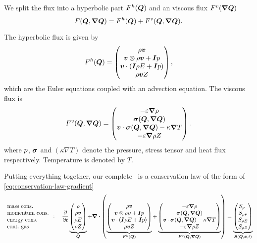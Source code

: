 We split the flux into a hyperbolic part $F^{h}(\bm{Q})$ and an viscous flux $\viscFlux(\gradQ)$
\begin{equation}
  \label{eq:flux}
  \flux(\Q, \gradQ) = \hyperFlux(\Q) + \viscFlux(\Q, \gradQ).
\end{equation}

\newcommand{\diffCoeff}{\varepsilon}
\newcommand{\hyperFluxDef}{
  \begin{pmatrix}
    \Qj \\
    \Qv  \otimes \Qj + \bm{I} \pressure  \\
    \Qv \cdot (\bm{I} \QE + \bm{I} \pressure) \\
    \Qj \QZZ
  \end{pmatrix}
}

\newcommand{\viscFluxDef}{
  \begin{pmatrix}
     -\diffCoeff \gradient{\Qrho}\\
     \stressT (\Q, \gradQ)  \\
     \Qv \cdot \stressT (\Q, \gradQ) - \kappa \gradient{T}\\
     -\diffCoeff \gradient{\QZ}
   \end{pmatrix}
}

The hyperbolic flux is given by
\begin{equation}
  \label{eq:hyper-flux}
  \hyperFlux(\Q) = \hyperFluxDef,
\end{equation}
which are the Euler equations coupled with an advection equation.
The viscous flux is
\begin{equation}
  \label{eq:visc-flux}
  \viscFlux(\Q, \gradQ) = \viscFluxDef.
\end{equation}
where $p$, $\bm{\sigma}$ and $(\kappa \nabla T)$ denote the pressure, stress tensor and heat flux respectively.
Temperature is denoted by $T$.


Putting everything together, our complete \pde\ is a conservation law of the form of \cref{eq:conservation-law-gradient}
\begin{equation}
 \begin{array}{l}
 \text{mass cons.} \\
 \text{momentum cons.} \\
 \text{energy cons.} \\
 \text{cont.\ gas} 
\end{array}
:
\quad
  \pdv{}{t}
  \underbrace{
  \begin{pmatrix}
    \Qrho\\
    \Qj\\
    \QE\\
    \QZ
    \end{pmatrix}}_{\Q}
  + 
  \divergence{
  \left(
   \underbrace{\hyperFluxDef}_{\hyperFlux(\Q)}
+
\underbrace{\viscFluxDef}_{\viscFlux(\Q, \gradQ)}
  \right)}
 =
  \underbrace{
  \begin{pmatrix}
    S_{\Qrho\phantom{\Qrho}}\\
    S_{\Qj}\\
    S_{\QE}\\
    S_{\QZ}
    \end{pmatrix}}_{\source(\Q, \bm{x}, t)}
\end{equation}

